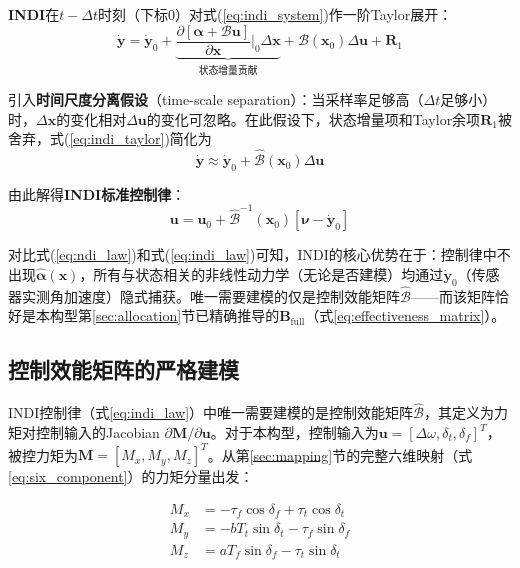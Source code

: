 \textbf{INDI}在$t-\Delta t$时刻（下标$0$）对式(\ref{eq:indi_system})作一阶Taylor展开\cite{sieberling2010robust,pollack2023robust}：
\begin{equation}
    \dot{\mathbf{y}} = \dot{\mathbf{y}}_0 + \underbrace{\frac{\partial[\boldsymbol{\alpha}+\mathcal{B}\mathbf{u}]}{\partial\mathbf{x}}\Big|_0 \Delta\mathbf{x}}_{\text{状态增量贡献}} + \mathcal{B}(\mathbf{x}_0)\Delta\mathbf{u} + \mathbf{R}_1
    \label{eq:indi_taylor}
\end{equation}

引入\textbf{时间尺度分离假设}（time-scale separation）：当采样率足够高（$\Delta t$足够小）时，$\Delta\mathbf{x}$的变化相对$\Delta\mathbf{u}$的变化可忽略。在此假设下，状态增量项和Taylor余项$\mathbf{R}_1$被舍弃，式(\ref{eq:indi_taylor})简化为
\begin{equation}
    \dot{\mathbf{y}} \approx \dot{\mathbf{y}}_0 + \hat{\mathcal{B}}(\mathbf{x}_0)\Delta\mathbf{u}
    \label{eq:indi_simplified}
\end{equation}

由此解得\textbf{INDI标准控制律}：
\begin{equation}
    \boxed{\mathbf{u} = \mathbf{u}_0 + \hat{\mathcal{B}}^{-1}(\mathbf{x}_0)\left[\boldsymbol{\nu} - \dot{\mathbf{y}}_0\right]}
    \label{eq:indi_law}
\end{equation}

对比式(\ref{eq:ndi_law})和式(\ref{eq:indi_law})可知，INDI的核心优势在于：控制律中不出现$\hat{\boldsymbol{\alpha}}(\mathbf{x})$，所有与状态相关的非线性动力学（无论是否建模）均通过$\dot{\mathbf{y}}_0$（传感器实测角加速度）隐式捕获。唯一需要建模的仅是控制效能矩阵$\hat{\mathcal{B}}$——而该矩阵恰好是本构型第\ref{sec:allocation}节已精确推导的$\mathbf{B}_{\mathrm{full}}$（式\ref{eq:effectiveness_matrix}）。

\subsection{控制效能矩阵的严格建模}

INDI控制律（式\ref{eq:indi_law}）中唯一需要建模的是控制效能矩阵$\hat{\mathcal{B}}$，其定义为力矩对控制输入的Jacobian $\partial\mathbf{M}/\partial\mathbf{u}$。对于本构型，控制输入为$\mathbf{u}=[\Delta\omega,\delta_t,\delta_f]^T$，被控力矩为$\mathbf{M}=[M_x,M_y,M_z]^T$。从第\ref{sec:mapping}节的完整六维映射（式\ref{eq:six_component}）的力矩分量出发：

\begin{equation}
    \begin{aligned}
        M_x &= -\tau_f \cos\delta_f + \tau_t \cos\delta_t \\
        M_y &= -b T_t \sin\delta_t - \tau_f \sin\delta_f \\
        M_z &= a T_f \sin\delta_f - \tau_t \sin\delta_t
    \end{aligned}
    \label{eq:moment_full_nonlinear}
\end{equation}

